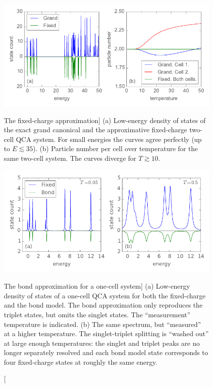 \begin{figure}
  \center
  \includegraphics{fixed_charge_approximation}
  \caption
  [The fixed-charge approximation]
  {
  (a) Low-energy density of states of the exact grand canonical and the
  approximative fixed-charge two-cell QCA system. For small energies the curves
  agree perfectly (up to $E \lesssim 35$). (b) Particle number per cell over
  temperature for the same two-cell system. The curves diverge for $T \gtrsim
  10$.
  }
  \label{fig:fixed_charge_approximation}
 
  \vspace*{0.75cm}

  \includegraphics{bond_approximation1}
  \caption
  [The bond approximation for a one-cell system]
  {
  (a) Low-energy density of states of a one-cell QCA system for both the
  fixed-charge and the bond model. The bond approximation only reproduces the
  triplet states, but omits the singlet states. The ``measurement'' temperature
  is indicated. (b) The same spectrum, but ``measured'' at a higher temperature.
  The singlet-triplet splitting is ``washed out'' at large enough temperatures:
  the singlet and triplet peaks are no longer separately resolved and each bond
  model state corresponds to four fixed-charge states at roughly the same
  energy.
  }
  \label{fig:bond_approximation1}
\end{figure}

